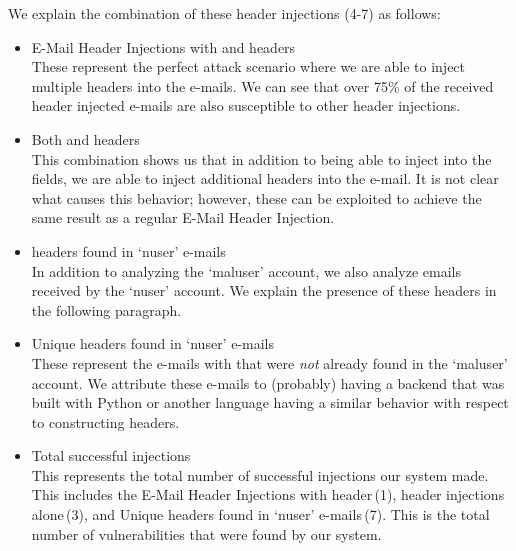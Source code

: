 
We explain the combination of these header injections (4-7) as follows:
\begin{itemize}
	\item E-Mail Header Injections with  and  headers\\
	These represent the perfect attack scenario where we are able to inject multiple headers into the e-mails. We can see that over 75\% of the received  header injected e-mails are also susceptible to other header injections.
	
	\item Both  and  headers \\
	This combination shows us that in addition to being able to inject into the  fields, we are able to inject additional headers into the e-mail. It is not clear what causes this behavior; however, these can be exploited to achieve the same result as a regular E-Mail Header Injection.
	
	\item {} headers found in `nuser' e-mails\\
	In addition to analyzing the `maluser' account, we also analyze emails received by the `nuser' account. We explain the presence of these headers in the following paragraph.

	\item Unique  headers found in `nuser' e-mails\\
	These represent the e-mails with  that were \emph{not} already found in the `maluser' account. We attribute these e-mails to (probably) having a backend that was built with Python or another language having a similar behavior with respect to constructing headers.
	
	\item Total successful injections\\
	This represents the total number of successful injections our system made. This includes the E-Mail Header Injections with  header\,(1),  header injections alone\,(3), and Unique  headers found in `nuser' e-mails\,(7). This is the total number of vulnerabilities that were found by our system.
	
\end{itemize}
